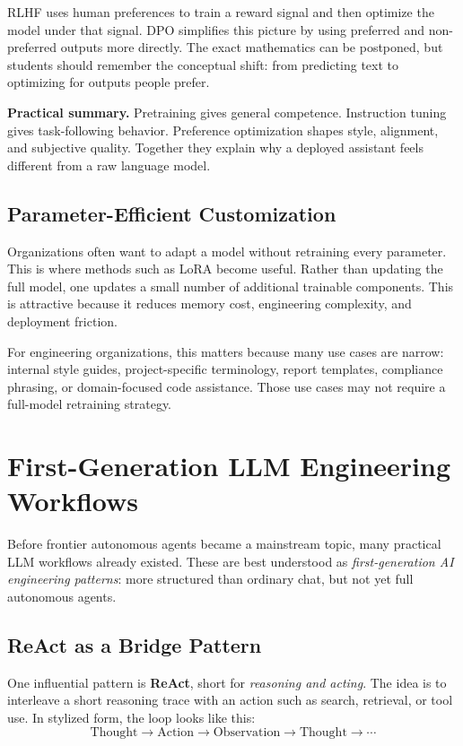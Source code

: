 \documentclass[12pt]{article}
\begin{document}
RLHF uses human preferences to train a reward signal and then optimize the model under that signal. DPO simplifies this picture by using preferred and non-preferred outputs more directly. The exact mathematics can be postponed, but students should remember the conceptual shift: from predicting text to optimizing for outputs people prefer.

\begin{def-box}
\textbf{Practical summary.} Pretraining gives general competence. Instruction tuning gives task-following behavior. Preference optimization shapes style, alignment, and subjective quality. Together they explain why a deployed assistant feels different from a raw language model.
\end{def-box}

\subsection{Parameter-Efficient Customization}

Organizations often want to adapt a model without retraining every parameter. This is where methods such as LoRA become useful. Rather than updating the full model, one updates a small number of additional trainable components. This is attractive because it reduces memory cost, engineering complexity, and deployment friction.

For engineering organizations, this matters because many use cases are narrow: internal style guides, project-specific terminology, report templates, compliance phrasing, or domain-focused code assistance. Those use cases may not require a full-model retraining strategy.

\section{First-Generation LLM Engineering Workflows}

Before frontier autonomous agents became a mainstream topic, many practical LLM workflows already existed. These are best understood as \emph{first-generation AI engineering patterns}: more structured than ordinary chat, but not yet full autonomous agents.

\subsection{ReAct as a Bridge Pattern}

One influential pattern is \textbf{ReAct}, short for \emph{reasoning and acting}. The idea is to interleave a short reasoning trace with an action such as search, retrieval, or tool use. In stylized form, the loop looks like this:
\begin{equation}
    \text{Thought} \rightarrow \text{Action} \rightarrow \text{Observation} \rightarrow \text{Thought} \rightarrow \cdots
    \label{t16eq:react}
\end{equation}
\end{document}
